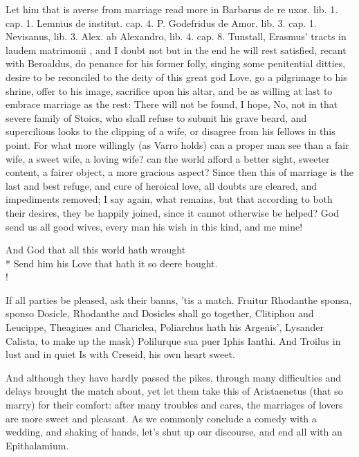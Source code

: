Let him that is averse from marriage read more in Barbarus de re uxor.
lib. 1. cap. 1. Lemnius de institut. cap. 4. P. Godefridus de Amor.
lib. 3. cap. 1. Nevisanus, lib. 3. Alex. ab Alexandro, lib. 4.
cap. 8. Tunstall, Erasmus' tracts in laudem matrimonii \etc{}, and I doubt
not but in the end he will rest satisfied, recant with Beroaldus, do
penance for his former folly, singing some penitential ditties, desire
to be reconciled to the deity of this great god Love, go a pilgrimage
to his shrine, offer to his image, sacrifice upon his altar, and be as
willing at last to embrace marriage as the rest: There will not be
found, I hope, No, not in that severe family of Stoics, who shall
refuse to submit his grave beard, and supercilious looks to the
clipping of a wife, or disagree from his fellows in this point. For
what more willingly (as Varro holds) can a proper man see than a
fair wife, a sweet wife, a loving wife? can the world afford a better
sight, sweeter content, a fairer object, a more gracious aspect?
Since then this of marriage is the last and best refuge, and cure of
heroical love, all doubts are cleared, and impediments removed; I say
again, what remains, but that according to both their desires, they be
happily joined, since it cannot otherwise be helped? God send us all
good wives, every man his wish in this kind, and me mine!
%
{\gothfont%
\begin{versewithlinenos}{2}{1}{1}%
And God that all this world hath wrought\\*
Send him his Love that hath it so deere bought.\\!
\end{versewithlinenos}%
}%

If all parties be pleased, ask their banns, 'tis a match. Fruitur
Rhodanthe sponsa, sponso Dosicle, Rhodanthe and Dosicles shall go
together, Clitiphon and Leucippe, Theagines and Chariclea, Poliarchus
hath his Argenis', Lysander Calista, to make up the mask)
Polilurque sua puer Iphis Ianthi.
And Troilus in lust and in quiet
Is with Creseid, his own heart sweet.

And although they have hardly passed the pikes, through many
difficulties and delays brought the match about, yet let them take this
of  Aristaenetus (that so marry) for their comfort: after
many troubles and cares, the marriages of lovers are more sweet and
pleasant. As we commonly conclude a comedy with a wedding, and
shaking of hands, let's shut up our discourse, and end all with an
Epithalamium.

